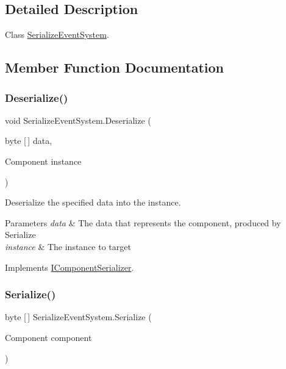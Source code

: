 \subsection{Detailed Description}
Class \hyperlink{class_serialize_event_system}{Serialize\+Event\+System}. 



\subsection{Member Function Documentation}
\mbox{\label{class_serialize_event_system_a27ee6101f51abf181d2bdf755708cdeb}} 
\subsubsection{\texorpdfstring{Deserialize()}{Deserialize()}}
{\footnotesize\ttfamily void Serialize\+Event\+System.\+Deserialize (\begin{DoxyParamCaption}\item[{byte \mbox{[}$\,$\mbox{]}}]{data,  }\item[{Component}]{instance }\end{DoxyParamCaption})\hspace{0.3cm}{\ttfamily [inline]}}



Deserialize the specified data into the instance. 


\begin{DoxyParams}{Parameters}
{\em data} & The data that represents the component, produced by Serialize\\
\hline
{\em instance} & The instance to target\\
\hline
\end{DoxyParams}


Implements \hyperlink{interface_i_component_serializer_a4cc366a5c78b33d47a90c209d8fed883}{I\+Component\+Serializer}.

\mbox{\label{class_serialize_event_system_a433cd679d73a8b4c4823e960b224231b}} 
\subsubsection{\texorpdfstring{Serialize()}{Serialize()}}
{\footnotesize\ttfamily byte \mbox{[}$\,$\mbox{]} Serialize\+Event\+System.\+Serialize (\begin{DoxyParamCaption}\item[{Component}]{component }\end{DoxyParamCaption})\hspace{0.3cm}{\ttfamily [inline]}}



